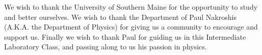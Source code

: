 

\nocite{*}
%
%
\begin{acknowledgments} 
We wish to thank the University of Southern Maine for the opportunity to study and better ourselves. We wish to thank the Department of Paul Nakroshis (A.K.A. the Department of Physics) for giving us a community to encourage and support us. Finally we wish to thank Paul for guiding us in this Intermediate Laboratory Class, and passing along to us his passion in physics.
\end{acknowledgments}
%
%
%
%
%
%
%
